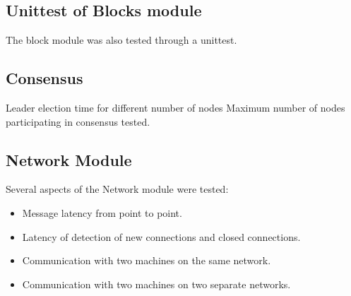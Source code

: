 \subsection{Unittest of Blocks module}
The block module was also tested through a unittest. 

\subsection{Consensus}
Leader election time for different number of nodes
Maximum number of nodes participating in consensus tested.

\subsection{Network Module}
Several aspects of the Network module were tested:
\begin{itemize}
\item Message latency from point to point.
\item Latency of detection of new connections and closed connections.
\item Communication with two machines on the same network.
\item Communication with two machines on two separate networks.
\end{itemize}



